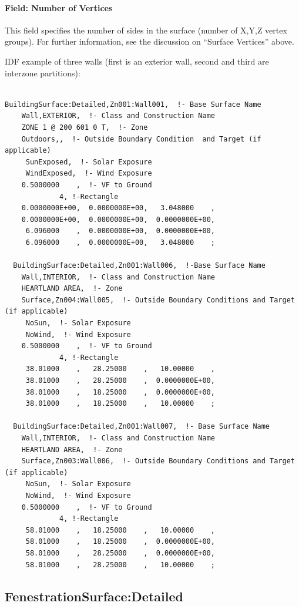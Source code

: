 \paragraph{Field: Number of Vertices}\label{field-number-of-vertices-3}

This field specifies the number of sides in the surface (number of X,Y,Z vertex groups). For further information, see the discussion on ``Surface Vertices'' above.

IDF example of three walls (first is an exterior wall, second and third are interzone partitions):

\begin{lstlisting}

BuildingSurface:Detailed,Zn001:Wall001,  !- Base Surface Name
    Wall,EXTERIOR,  !- Class and Construction Name
    ZONE 1 @ 200 601 0 T,  !- Zone
    Outdoors,,  !- Outside Boundary Condition  and Target (if applicable)
     SunExposed,  !- Solar Exposure
     WindExposed,  !- Wind Exposure
    0.5000000    ,  !- VF to Ground
             4, !-Rectangle
    0.0000000E+00,  0.0000000E+00,   3.048000    ,
    0.0000000E+00,  0.0000000E+00,  0.0000000E+00,
     6.096000    ,  0.0000000E+00,  0.0000000E+00,
     6.096000    ,  0.0000000E+00,   3.048000    ;

  BuildingSurface:Detailed,Zn001:Wall006,  !-Base Surface Name
    Wall,INTERIOR,  !- Class and Construction Name
    HEARTLAND AREA,  !- Zone
    Surface,Zn004:Wall005,  !- Outside Boundary Conditions and Target (if applicable)
     NoSun,  !- Solar Exposure
     NoWind,  !- Wind Exposure
    0.5000000    ,  !- VF to Ground
             4, !-Rectangle
     38.01000    ,   28.25000    ,   10.00000    ,
     38.01000    ,   28.25000    ,  0.0000000E+00,
     38.01000    ,   18.25000    ,  0.0000000E+00,
     38.01000    ,   18.25000    ,   10.00000    ;

  BuildingSurface:Detailed,Zn001:Wall007,  !- Base Surface Name
    Wall,INTERIOR,  !- Class and Construction Name
    HEARTLAND AREA,  !- Zone
    Surface,Zn003:Wall006,  !- Outside Boundary Conditions and Target (if applicable)
     NoSun,  !- Solar Exposure
     NoWind,  !- Wind Exposure
    0.5000000    ,  !- VF to Ground
             4, !-Rectangle
     58.01000    ,   18.25000    ,   10.00000    ,
     58.01000    ,   18.25000    ,  0.0000000E+00,
     58.01000    ,   28.25000    ,  0.0000000E+00,
     58.01000    ,   28.25000    ,   10.00000    ;
\end{lstlisting}

\subsection{FenestrationSurface:Detailed}\label{fenestrationsurfacedetailed}

